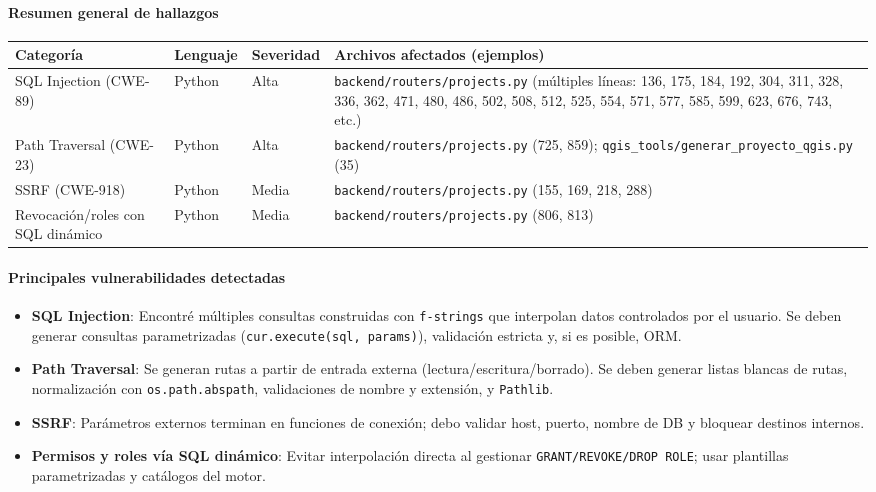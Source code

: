 \documentclass[12pt, a4paper]{article}
\begin{document}
\paragraph{Resumen general de hallazgos}
\begin{table}[h!]\footnotesize\centering
\begin{tabularx}{\textwidth}{@{} L{3.5cm} L{2.1cm} L{2.4cm} Y @{}}
\toprule
\textbf{Categoría} & \textbf{Lenguaje} & \textbf{Severidad} & \textbf{Archivos afectados (ejemplos)} \\
\midrule
SQL Injection (CWE-89) & Python & Alta & \texttt{backend/routers/projects.py} (múltiples líneas: 136, 175, 184, 192, 304, 311, 328, 336, 362, 471, 480, 486, 502, 508, 512, 525, 554, 571, 577, 585, 599, 623, 676, 743, etc.) \\
Path Traversal (CWE-23) & Python & Alta & \texttt{backend/routers/projects.py} (725, 859); \texttt{qgis\_tools/generar\_proyecto\_qgis.py} (35) \\
SSRF (CWE-918) & Python & Media & \texttt{backend/routers/projects.py} (155, 169, 218, 288) \\
Revocación/roles con SQL dinámico & Python & Media & \texttt{backend/routers/projects.py} (806, 813) \\
\bottomrule
\end{tabularx}
\end{table}

\paragraph{Principales vulnerabilidades detectadas}
\begin{itemize}
  \item \textbf{SQL Injection}: Encontré múltiples consultas construidas con \texttt{f-strings} que interpolan datos 
  controlados por el usuario. Se deben generar consultas parametrizadas (\texttt{cur.execute(sql, params)}), validación 
  estricta y, si es posible, ORM.
  \item \textbf{Path Traversal}: Se generan rutas a partir de entrada externa (lectura/escritura/borrado). Se deben  
  generar listas blancas de rutas, normalización con \texttt{os.path.abspath}, validaciones de nombre y extensión, y \texttt{Pathlib}.
  \item \textbf{SSRF}: Parámetros externos terminan en funciones de conexión; debo validar host, puerto, 
  nombre de DB y bloquear destinos internos.
  \item \textbf{Permisos y roles vía SQL dinámico}: Evitar interpolación directa al gestionar \texttt{GRANT/REVOKE/DROP ROLE}; 
  usar plantillas parametrizadas y catálogos del motor.
\end{itemize}
\end{document}
